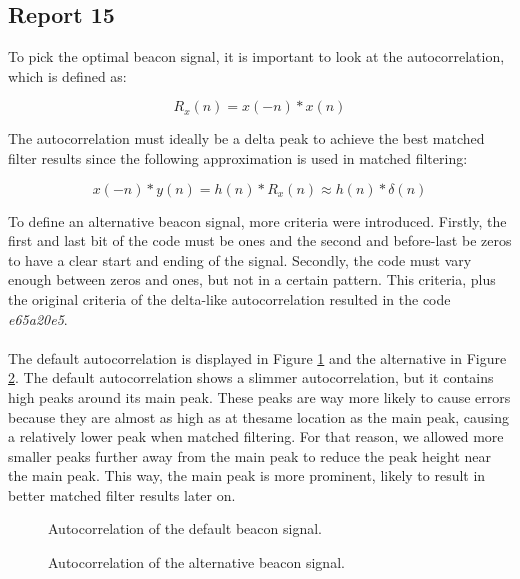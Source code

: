 \documentclass[final]{scrreprt} %
\begin{document}
\subsection{Report 15}
To pick the optimal beacon signal, it is important to look at the autocorrelation, which is defined as:

\begin{equation}
	R_x(n) = x(-n) * x(n)
\end{equation}

The autocorrelation must ideally be a delta peak to achieve the best matched filter results since the following approximation is used in matched filtering:

\begin{equation}
	x(-n) * y(n) = h(n) * R_x(n) \approx h(n) * \delta (n)
\end{equation}

To define an alternative beacon signal, more criteria were introduced.
Firstly, the first and last bit of the code must be ones and the second and before-last be zeros to have a clear start and ending of the signal.
Secondly, the code must vary enough between zeros and ones, but not in a certain pattern.
This criteria, plus the original criteria of the delta-like autocorrelation resulted in the code \emph{e65a20e5}.
\\ \\
The default autocorrelation is displayed in Figure \ref{fig:default-correlation} and the alternative in Figure \ref{fig:own-correlation}.
The default autocorrelation shows a slimmer autocorrelation, but it contains high peaks around its main peak.
These peaks are way more likely to cause errors because they are almost as high as at thesame location as the main peak, causing a relatively lower peak when matched filtering.
For that reason, we allowed more smaller peaks further away from the main peak to reduce the peak height near the main peak.
This way, the main peak is more prominent, likely to result in better matched filter results later on.

\begin{figure}[H]
	\centering
	\setlength\figureheight{4cm}
    	\setlength{}
	
	\caption{Autocorrelation of the default beacon signal.}
	\label{fig:default-correlation}
\end{figure}

\begin{figure}[H]
	\centering
	\setlength\figureheight{4cm}
    	\setlength{}
	
	\caption{Autocorrelation of the alternative beacon signal.}
	\label{fig:own-correlation}
\end{figure}
\end{document}
